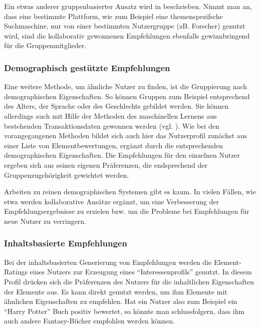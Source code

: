 Ein etwas anderer gruppenbasierter Ansatz wird in \citep{smyth05a} beschrieben. Nimmt man an, dass eine bestimmte Plattform, wie zum Beispiel eine themenspezifsche Suchmaschine, nur von einer bestimmten Nutzergruppe (zB. Forscher) genutzt wird, sind die kollaborativ gewonnenen Empfehlungen ebenfalls gewinnbringend für die Gruppenmitglieder.

\subsubsection{Demographisch gestützte Empfehlungen}
Eine weitere Methode, um ähnliche Nutzer zu finden, ist die Gruppierung nach demographischen Eigenschaften. So können Gruppen zum Beispiel entsprechend des Alters, der Sprache oder des Geschlechts gebildet werden. Sie können allerdings auch mit Hilfe der Methoden des maschinellen Lernens aus bestehenden Transaktionsdaten gewonnen werden (vgl. \citep{Burke:2002:HRS:586321.586352}). Wie bei den vorangegangenen Methoden bildet sich auch hier das Nutzerprofil zunächst aus einer Liste von Elementbewertungen, ergänzt durch die entsprechenden demographischen Eigenschaften. Die Empfehlungen für den einzelnen Nutzer ergeben sich aus seinen eigenen Präferenzen, die endsprechend der Gruppenzugehörigkeit gewichtet werden.

Arbeiten zu reinen demographischen Systemen gibt es kaum. In vielen Fällen, wie etwa \citep{Vozalis:2007:USD:1243505.1243639} werden kollaborative Ansätze ergänzt, um eine Verbesserung der Empfehlungsergebnisse zu erzielen bzw. um die Probleme bei Empfehlungen für neue Nutzer zu verringern. \citep{Burke:2002:HRS:586321.586352}

\subsubsection{Inhaltsbasierte Empfehlungen}\label{rec:contentrec}
Bei der inhaltsbasierten Generierung von Empfehlungen werden die Element-Ratings eines Nutzers zur Erzeugung eines ``Interessenprofils'' genutzt. In diesem Profil drücken sich die Präferenzen des Nutzers für die inhaltlichen Eigenschaften der Elemente aus. Es kann direkt genutzt werden, um ihm Elemente mit ähnlichen Eigenschaften zu empfehlen. Hat ein Nutzer also zum Beispiel ein ``Harry Potter'' Buch positiv bewertet, so könnte man schlussfolgern, dass ihm auch andere Fantasy-Bücher empfohlen werden können.

